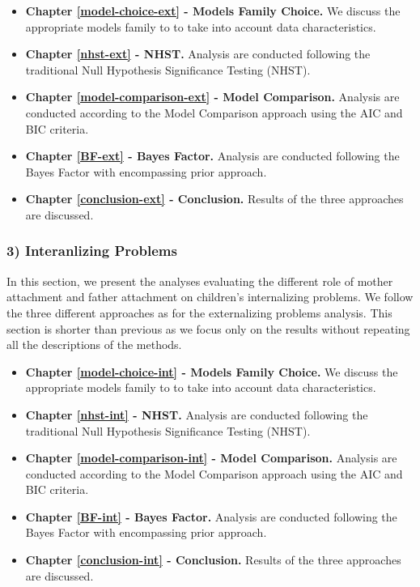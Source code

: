 \documentclass[
]{book}
\providecommand{\tightlist}{%
  \setlength{\itemsep}{0pt}\setlength{\parskip}{0pt}}
\begin{document}
\begin{itemize}
\tightlist
\item
  \textbf{Chapter \ref{model-choice-ext} - Models Family Choice.} We discuss the appropriate models family to to take into account data characteristics.
\item
  \textbf{Chapter \ref{nhst-ext} - NHST.} Analysis are conducted following the traditional Null Hypothesis Significance Testing (NHST).
\item
  \textbf{Chapter \ref{model-comparison-ext} - Model Comparison.} Analysis are conducted according to the Model Comparison approach using the AIC and BIC criteria.
\item
  \textbf{Chapter \ref{BF-ext} - Bayes Factor.} Analysis are conducted following the Bayes Factor with encompassing prior approach.
\item
  \textbf{Chapter \ref{conclusion-ext} - Conclusion.} Results of the three approaches are discussed.
\end{itemize}

\hypertarget{interanlizing-problems}{%
\subsubsection*{3) Interanlizing Problems}\label{interanlizing-problems}}

In this section, we present the analyses evaluating the different role of mother attachment and father attachment on children's internalizing problems. We follow the three different approaches as for the externalizing problems analysis. This section is shorter than previous as we focus only on the results without repeating all the descriptions of the methods.

\begin{itemize}
\tightlist
\item
  \textbf{Chapter \ref{model-choice-int} - Models Family Choice.} We discuss the appropriate models family to to take into account data characteristics.
\item
  \textbf{Chapter \ref{nhst-int} - NHST.} Analysis are conducted following the traditional Null Hypothesis Significance Testing (NHST).
\item
  \textbf{Chapter \ref{model-comparison-int} - Model Comparison.} Analysis are conducted according to the Model Comparison approach using the AIC and BIC criteria.
\item
  \textbf{Chapter \ref{BF-int} - Bayes Factor.} Analysis are conducted following the Bayes Factor with encompassing prior approach.
\item
  \textbf{Chapter \ref{conclusion-int} - Conclusion.} Results of the three approaches are discussed.
\end{itemize}
\end{document}
